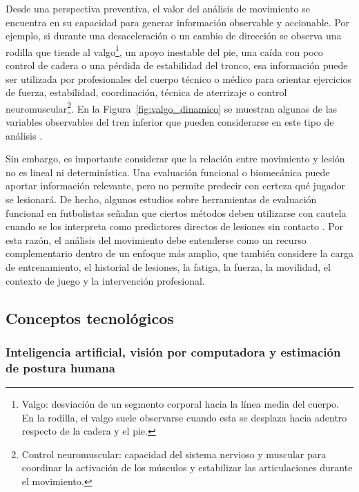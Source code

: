 Desde una perspectiva preventiva, el valor del análisis de movimiento se encuentra en su
capacidad para generar información observable y accionable. Por ejemplo, si durante una
desaceleración o un cambio de dirección se observa una rodilla que tiende al
valgo\footnote{Valgo: desviación de un segmento corporal hacia la línea media del cuerpo. En la
rodilla, el valgo suele observarse cuando esta se desplaza hacia adentro respecto de la cadera y
el pie.}, un apoyo inestable del pie, una caída con poco control de cadera o una pérdida de
estabilidad del tronco, esa información puede ser utilizada por profesionales del cuerpo técnico
o médico para orientar ejercicios de fuerza, estabilidad, coordinación, técnica de aterrizaje o
control neuromuscular\footnote{Control neuromuscular: capacidad del sistema nervioso y muscular
para coordinar la activación de los músculos y estabilizar las articulaciones durante el
movimiento.}. En la Figura~\ref{fig:valgo_dinamico} se muestran algunas de las variables
observables del tren inferior que pueden considerarse en este tipo de análisis
\parencite{DellaVillaEtAl2020,BuckthorpeEtAl2024ACL}.



Sin embargo, es importante considerar que la relación entre movimiento y lesión no es lineal ni
determinística. Una evaluación funcional o biomecánica puede aportar información relevante, pero
no permite predecir con certeza qué jugador se lesionará. De hecho, algunos estudios sobre
herramientas de evaluación funcional en futbolistas señalan que ciertos métodos deben utilizarse
con cautela cuando se los interpreta como predictores directos de lesiones sin contacto
\parencite{SmithHanlon2017}. Por esta razón, el análisis del movimiento debe entenderse como un
recurso complementario dentro de un enfoque más amplio, que también considere la carga de
entrenamiento, el historial de lesiones, la fatiga, la fuerza, la movilidad, el contexto de
juego y la intervención profesional.

\subsection{Conceptos tecnológicos}

\subsubsection{Inteligencia artificial, visión por computadora y estimación de postura humana}

